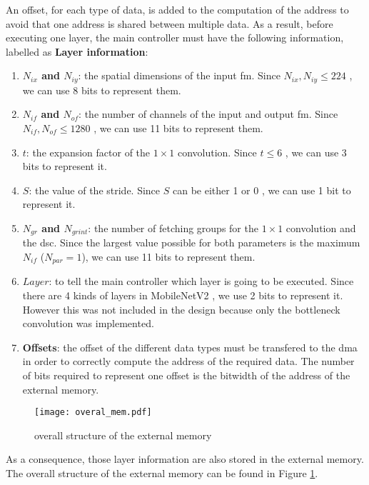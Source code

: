 An offset, for each type of data, is added to the computation of the address to avoid that one address is shared between multiple data. As a result, before executing one layer, the main controller must have the following information, labelled as \textbf{Layer information}:
%
\begin{enumerate}
    \item \textbf{$N_{ix}$ and $N_{iy}$}: the spatial dimensions of the input \acrshort{fm}. Since $N_{ix}, N_{iy} \leq 224$ \cite{sandler_mobilenetv2_2018}, we can use 8 bits to represent them.
    \item \textbf{$N_{if}$ and $N_{of}$}: the number of channels of the input  and output \acrshort{fm}. Since $N_{if}, N_{of} \leq 1280$ \cite{sandler_mobilenetv2_2018}, we can use 11 bits to represent them.
    \item \textbf{$t$}: the expansion factor of the $1 \times 1$ convolution. Since $t \leq 6$ \cite{sandler_mobilenetv2_2018}, we can use 3 bits to represent it.
    \item \textbf{$S$}: the value of the stride. Since $S$ can be either 1 or 0 \cite{sandler_mobilenetv2_2018}, we can use 1 bit to represent it.
    \item \textbf{$N_{gr}$ and $N_{grint}$}: the number of fetching groups for the $1 \times 1$ convolution and the \acrshort{dsc}. Since the largest value possible for both parameters is the maximum $N_{if}$ ($N_{par} = 1$), we can use 11 bits to represent them.
    \item \textbf{$Layer$}: to tell the main controller which layer is going to be executed. Since there are 4 kinds of layers in MobileNetV2 \cite{sandler_mobilenetv2_2018}, we use 2 bits to represent it. However this was not included in the design because only the bottleneck convolution was implemented.
    \item \textbf{Offsets}: the offset of the different data types must be transfered to the \acrshort{dma} in order to correctly compute the address of the required data. The number of bits required to represent one offset is the bitwidth of the address of the external memory.
\end{enumerate}

%
\begin{figure}
    \centering
    \texttt{[image: overal\_mem.pdf]}
    \caption{overall structure of the external memory}
    \label{fig:overal_mem}
\end{figure}
%
As a consequence, those layer information are also stored in the external memory. The overall structure of the external memory can be found in Figure \ref{fig:overal_mem}.

